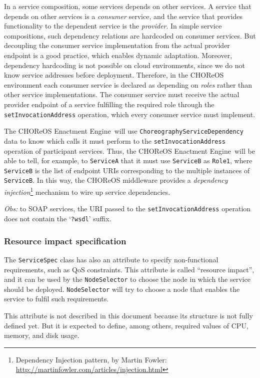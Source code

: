 \documentclass[a4paper, 10pt]{article}
\newcommand{\ee}{CHOReOS Enactment Engine}
\begin{document}
In a service composition, some services depends on other services. A service that depends on other services is a \emph{consumer} service, and the service that provides functionality to the dependent service is the \emph{provider}. In simple service compositions, such dependency relations are hardcoded on consumer services. But decoupling the consumer service implementation from the actual provider endpoint is a good practice, which enables dynamic adaptation. Moreover, dependency hardcoding is not possible on cloud environments, since we do not know service addresses before deployment. Therefore, in the CHOReOS environment each consumer service is declared as depending on \emph{roles} rather than other service implementations. The consumer service must receive the actual provider endpoint of a service fulfilling the required role through the \verb!setInvocationAddress! operation, which every consumer service must implement.  

The \ee\ will use \verb!ChoreographyServiceDependency! data to know which calls it must perform to the  \verb!setInvocationAddress! operation of participant services. Thus, the \ee\ will be able to tell, for example, to \verb!ServiceA! that it must use \verb!ServiceB! as \verb!Role1!, where \verb!ServiceB! is the list of endpoint URIs corresponding to the multiple instances of \verb!ServiceB!. In this way, the CHOReOS middleware provides a \emph{dependency injection}\footnote{Dependency Injection pattern, by Martin Fowler: \url{http://martinfowler.com/articles/injection.html}} mechanism to wire up service dependencies.

\emph{Obs:} to SOAP services, the URI passed to the \texttt{setInvocationAddress} operation does not contain the `\texttt{?wsdl}' suffix.

\subsubsection*{Resource impact specification}

The \verb!ServiceSpec! class has also an attribute to specify non-functional requirements, such as QoS constraints. This attribute is called ``resource impact'', and it can be used by the \verb!NodeSelector! to choose the node in which the service should be deployed. \verb!NodeSelector! will try to choose a node that enables the service to fulfil such requirements.

This attribute is not described in this document because its structure is not fully defined yet. But it is expected to define, among others, required values of CPU, memory, and disk usage.
\end{document}
